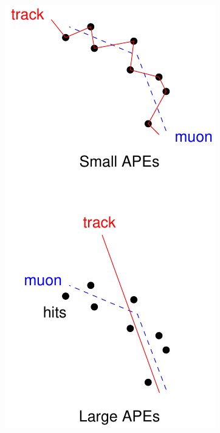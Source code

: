 \documentclass[compress]{beamer}
\begin{document}
\begin{frame}
\begin{columns}
\includegraphics[width=\linewidth]{flexibility.pdf}
\end{columns}
\end{frame}
\end{document}
